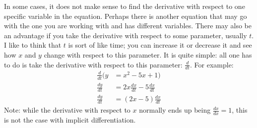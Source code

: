 \documentclass[../revisedMain.tex]{subfiles}
\begin{document}
	In some cases, it does not make sense to find the derivative with respect to one specific variable in the equation. Perhaps there is another equation that may go with the one you are working with and has different variables. There may also be an advantage if you take  the derivative with respect to some parameter, usually $t$. I like to think that $t$ is sort of like time; you can increase it or decrease it and see how $x$ and $y$ change with respect to this parameter. It is quite simple: all one has to do is take the derivative with respect to this parameter: $\displaystyle\frac{d}{dt} $. For example: 
	\begin{equation}
	\begin{split}
	\frac{d}{dt}( y&=x^2-5x+1)\\
	\frac{dy}{dt}&=2x\frac{dx}{dt}-5\frac{dx}{dt}\\
	\frac{dy}{dt}&=(2x-5)\frac{dx}{dt}
	\end{split}
	\end{equation}
	Note:  while the derivative with respect to $x$ normally ends up being $\displaystyle\frac{dx}{dx}=1$, this is not the case with implicit differentiation.
\end{document}

